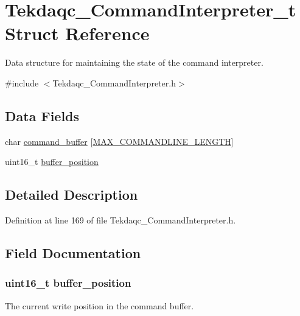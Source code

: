 \hypertarget{struct_tekdaqc___command_interpreter__t}{\section{Tekdaqc\-\_\-\-Command\-Interpreter\-\_\-t Struct Reference}
\label{struct_tekdaqc___command_interpreter__t}
}


Data structure for maintaining the state of the command interpreter.  




{\ttfamily \#include $<$Tekdaqc\-\_\-\-Command\-Interpreter.\-h$>$}

\subsection*{Data Fields}
\begin{DoxyCompactItemize}
\item 
char \hyperlink{struct_tekdaqc___command_interpreter__t_a80b2496e0ec37858a3a015b964b11eda}{command\-\_\-buffer} \mbox{[}\hyperlink{group__command__parser_gaab74dfff7eb006955f2aabec581f8d9f}{M\-A\-X\-\_\-\-C\-O\-M\-M\-A\-N\-D\-L\-I\-N\-E\-\_\-\-L\-E\-N\-G\-T\-H}\mbox{]}
\item 
uint16\-\_\-t \hyperlink{struct_tekdaqc___command_interpreter__t_a67f8ba6e964bdd849202264bd4969a57}{buffer\-\_\-position}
\end{DoxyCompactItemize}


\subsection{Detailed Description}


Definition at line 169 of file Tekdaqc\-\_\-\-Command\-Interpreter.\-h.



\subsection{Field Documentation}
\hypertarget{struct_tekdaqc___command_interpreter__t_a67f8ba6e964bdd849202264bd4969a57}{
\subsubsection[{buffer\-\_\-position}]{\setlength{\rightskip}{0pt plus 5cm}uint16\-\_\-t buffer\-\_\-position}}\label{struct_tekdaqc___command_interpreter__t_a67f8ba6e964bdd849202264bd4969a57}
The current write position in the command buffer. 

